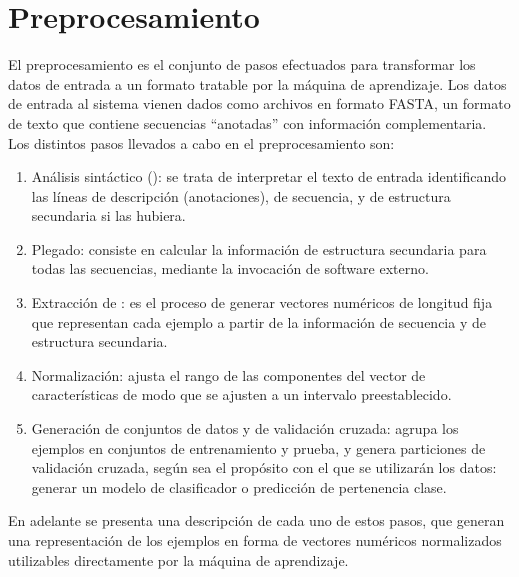 %
%
%
\section{Preprocesamiento}
%
El preprocesamiento es el conjunto de pasos efectuados para
transformar los datos de entrada a un formato tratable por la máquina
de aprendizaje.  Los datos de entrada al sistema vienen dados como
archivos en formato FASTA, un formato de texto que contiene secuencias
``anotadas'' con información complementaria.
Los distintos pasos llevados a cabo en el preprocesamiento son:
%
\begin{enumerate}
\item
  Análisis sintáctico (): se trata de interpretar el
  texto de entrada identificando las líneas de descripción
  (anotaciones), de secuencia, y de estructura secundaria si las
  hubiera.
\item
  Plegado: consiste en calcular la información de estructura
  secundaria para todas las secuencias, mediante la invocación de
  software externo.
\item
  Extracción de : es el proceso de generar vectores
  numéricos de longitud fija que representan cada ejemplo a partir de
  la información de secuencia y de estructura secundaria.
\item
  Normalización: ajusta el rango de las componentes del vector de
  características de modo que se ajusten a un intervalo
  preestablecido.
\item
  Generación de conjuntos de datos y de validación cruzada:
  agrupa los ejemplos en conjuntos de entrenamiento y prueba, y genera
  particiones de validación cruzada, según sea el propósito con el que
  se utilizarán los datos: generar un modelo de clasificador o
  predicción de pertenencia clase.
\end{enumerate}
%
En adelante se presenta una descripción de cada uno de estos pasos,
que generan una representación de los ejemplos en forma de
vectores numéricos normalizados utilizables directamente por la
máquina de aprendizaje.
